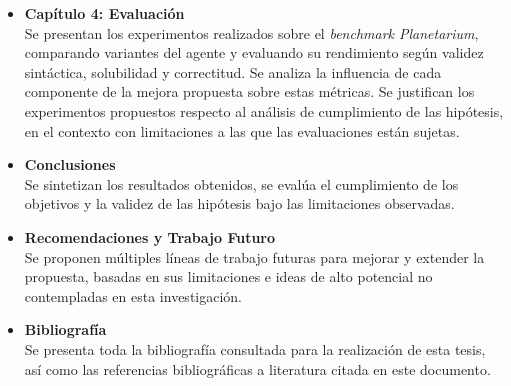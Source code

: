 \begin{itemize}
    \item \textbf{Capítulo 4: Evaluación} \\
    Se presentan los experimentos realizados sobre el \textit{benchmark Planetarium}, comparando variantes del agente y evaluando su rendimiento según validez sintáctica, solubilidad y correctitud. Se analiza la influencia de cada componente de la mejora propuesta sobre estas métricas. Se justifican los experimentos propuestos respecto al análisis de cumplimiento de las hipótesis, en el contexto con limitaciones a las que las evaluaciones están sujetas.
    
    \item \textbf{Conclusiones} \\
    Se sintetizan los resultados obtenidos, se evalúa el cumplimiento de los objetivos y la validez de las hipótesis bajo las limitaciones observadas.
    
   \item \textbf{Recomendaciones y Trabajo Futuro} \\
    Se proponen múltiples líneas de trabajo futuras para mejorar y extender la propuesta, basadas en sus limitaciones e ideas de alto potencial no contempladas en esta investigación.

    \item \textbf{Bibliografía} \\
    Se presenta toda la bibliografía consultada para la realización de esta tesis, así como las referencias bibliográficas a literatura citada en este documento.
\end{itemize}